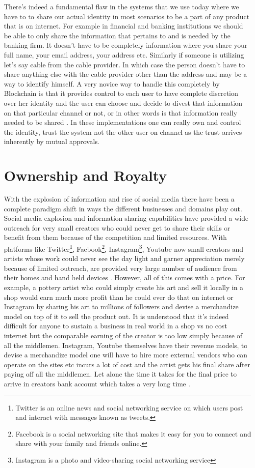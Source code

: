 There's indeed a fundamental flaw in the systems that we use today where we have to to share our actual identity in most scenarios to be a part of any product that is on internet. For example in financial and banking institutions we should be able to only share the information that pertains to and is needed by the banking firm. It doesn't have to be completely information where you share your full name, your email address, your address etc. Similarly if someone is utilizing let's say cable from the cable provider. In which case the person doesn't have to share anything else with the cable provider other than the address and may be a way to identify himself. A very novice way to handle this completely by Blockchain is that it provides control to each user to have complete discretion over her identity and the user can choose and decide to divest that information on that particular channel or not, or in other words is that information really needed to be shared \cite{alex23}. In these implementations one can really own and control the identity, trust the system not the other user on channel as the trust arrives inherently by mutual approvals.


\section{Ownership and Royalty}
With the explosion of information and rise of social media there have been a complete paradigm shift in ways the different businesses and domains play out. Social media explosion and information sharing capabilities have provided a wide outreach for very small creators who could never get to share their skills or benefit from them because of the competition and limited resources. With platforms like Twitter\footnote{Twitter is an online news and social networking service on which users post and interact with messages known as tweets.}, Facbook\footnote{Facebook is a social networking site that makes it easy for you to connect and share with your family and friends online.}, Instagram\footnote{Instagram is a photo and video-sharing social networking service}, Youtube now small creators and artists whose work could never see the day light and garner appreciation merely because of limited outreach, are provided very large number of audience from their homes and hand held devices \cite{saleem24}. However, all of this comes with a price. For example, a pottery artist who could simply create his art and sell it locally in a shop would earn much more profit than he could ever do that on internet or Instagram by sharing his art to millions of followers and devise a merchandize model on top of it to sell the product out. It is understood that it's indeed difficult for anyone to sustain a business in real world in a shop vs no cost internet but the comparable earning of the creator is too low simply because of all the middlemen. Instagram, Youtube themselves have their revenue models, to devise a merchandize model one will have to hire more external vendors who can operate on the sites etc incurs a lot of cost and the artist gets his final share after paying off all the middlemen. Let alone the time it takes for the final price to arrive in creators bank account which takes a very long time \cite{margaret25}.

